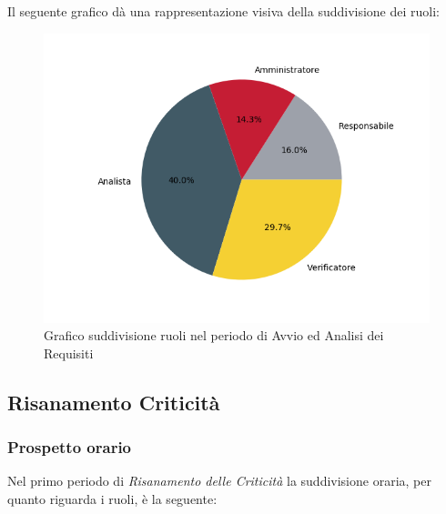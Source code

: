 Il seguente grafico dà una rappresentazione visiva della suddivisione dei ruoli:
\begin{figure}[H]
	\centering
  		\includegraphics[width=1\linewidth]{./images/torta_aar.png}
  		\caption{Grafico suddivisione ruoli nel periodo di Avvio ed Analisi dei Requisiti}
  		\label{fig:grafico suddivione ruoli periodo di Avvio ed analisi dei requisiti}
\end{figure}

\newpage
\subsection{Risanamento Criticità}
\label{PRC1}
\subsubsection{Prospetto orario}

Nel primo periodo di \textit{Risanamento delle Criticità} la suddivisione oraria, per quanto riguarda i ruoli, è la seguente:

